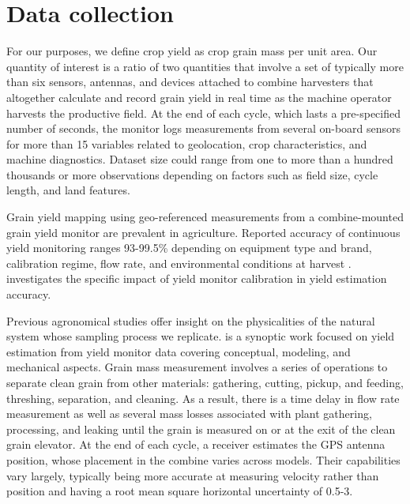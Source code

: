 \chapter{Data collection}

For our purposes, we define crop yield as crop grain mass per unit
area. Our quantity of interest is a ratio of two quantities that
involve a set of typically more than six sensors, antennas, and
devices attached to combine harvesters that altogether calculate and
record grain yield in real time as the machine operator harvests the
productive field. At the end of each cycle, which lasts a
pre-specified number of seconds, the monitor logs measurements from
several on-board sensors for more than 15 variables related to
geolocation, crop characteristics, and machine diagnostics. Dataset
size could range from one to more than a hundred thousands or more
observations depending on factors such as field size, cycle length,
and land features.

Grain yield mapping using geo-referenced measurements from a
combine-mounted grain yield monitor are prevalent in
agriculture. Reported accuracy of continuous yield monitoring ranges
93-99.5\% depending on equipment type and brand, calibration regime,
flow rate, and environmental conditions at harvest
\citep{birrellComparisonSensorsTechniques1996, Fulton2009,
  Lyle2013}. \cite{Arslan2002} investigates the specific impact of
yield monitor calibration in yield estimation accuracy.

Previous agronomical studies offer insight on the physicalities of the
natural system whose sampling process we replicate. \cite{Ross2008} is
a synoptic work focused on yield estimation from yield monitor data
covering conceptual, modeling, and mechanical aspects. Grain mass
measurement involves a series of operations to separate clean grain
from other materials: gathering, cutting, pickup, and feeding,
threshing, separation, and cleaning. As a result, there is a time
delay in flow rate measurement as well as several mass losses
associated with plant gathering, processing, and leaking until the
grain is measured on or at the exit of the clean grain elevator. At
the end of each cycle, a receiver estimates the GPS antenna position,
whose placement in the combine varies across models. Their
capabilities vary largely, typically being more accurate at measuring
velocity rather than position and having a root mean square horizontal
uncertainty of 0.5-3.

